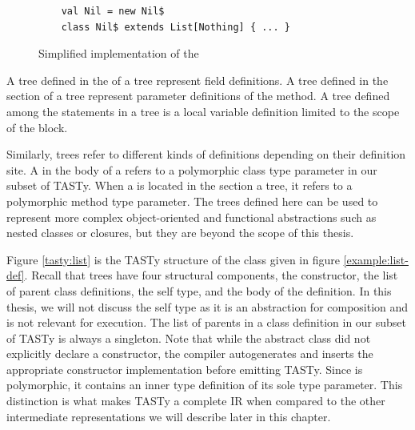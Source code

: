 \begin{figure}[!htb]
	\begin{verbatim}
	val Nil = new Nil$
	class Nil$ extends List[Nothing] { ... }
	\end{verbatim} 
	\caption{Simplified implementation of the }
	\label{example:decomp-object}
\end{figure}

A  tree defined in the  of a  tree represent field definitions.
A  tree defined in the  section of a  tree represent parameter definitions of the method.
A  tree defined among the statements in a  tree is a local variable definition limited to the scope of the block.

Similarly,  trees refer to different kinds of definitions depending on their definition site.
A  in the body of a  refers to a polymorphic class type parameter in our subset of TASTy.
When a  is located in the  section a  tree, it refers to a polymorphic method type parameter.
The trees defined here can be used to represent more complex object-oriented and functional abstractions such as nested classes or closures, but they are beyond the scope of this thesis.

Figure \ref{tasty:list} is the TASTy structure of the  class given in figure \ref{example:list-def}. 
Recall that  trees have four structural components, the constructor, the list of parent class definitions, the self type, and the body of the definition.
In this thesis, we will not discuss the self type as it is an abstraction for composition\cite{gilad:mixins}\cite{scala:calculus} and is not relevant for execution.
The list of parents in a class definition in our subset of TASTy is always a singleton.
Note that while the abstract  class did not explicitly declare a constructor, the compiler autogenerates and inserts the appropriate constructor implementation before emitting TASTy.
Since  is polymorphic, it contains an inner type definition of its sole type parameter.
This distinction is what makes TASTy a complete IR when compared to the other intermediate representations we will describe later in this chapter.


